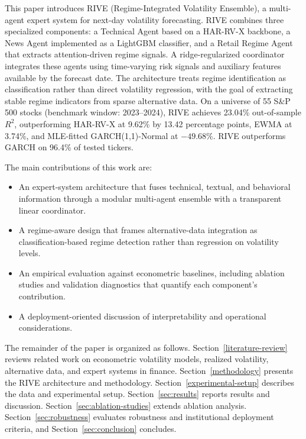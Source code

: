 \documentclass[review]{elsarticle}
\begin{document}
This paper introduces RIVE (Regime-Integrated Volatility Ensemble), a multi-agent expert system for next-day volatility forecasting. RIVE combines three specialized components: a Technical Agent based on a HAR-RV-X backbone, a News Agent implemented as a LightGBM classifier, and a Retail Regime Agent that extracts attention-driven regime signals. A ridge-regularized coordinator integrates these agents using time-varying risk signals and auxiliary features available by the forecast date. The architecture treats regime identification as classification rather than direct volatility regression, with the goal of extracting stable regime indicators from sparse alternative data. On a universe of 55 S\&P 500 stocks (benchmark window: 2023--2024), RIVE achieves 23.04\% out-of-sample $R^2$, outperforming HAR-RV-X at 9.62\% by 13.42 percentage points, EWMA at 3.74\%, and MLE-fitted GARCH(1,1)-Normal at $-49.68\%$. RIVE outperforms GARCH on 96.4\% of tested tickers.

The main contributions of this work are:
\begin{itemize}
    \item An expert-system architecture that fuses technical, textual, and behavioral information through a modular multi-agent ensemble with a transparent linear coordinator.
    \item A regime-aware design that frames alternative-data integration as classification-based regime detection rather than regression on volatility levels.
    \item An empirical evaluation against econometric baselines, including ablation studies and validation diagnostics that quantify each component's contribution.
    \item A deployment-oriented discussion of interpretability and operational considerations. %
\end{itemize}

The remainder of the paper is organized as follows. Section~\ref{literature-review} reviews related work on econometric volatility models, realized volatility, alternative data, and expert systems in finance. Section~\ref{methodology} presents the RIVE architecture and methodology. Section~\ref{experimental-setup} describes the data and experimental setup. Section~\ref{sec:results} reports results and discussion. Section~\ref{sec:ablation-studies} extends ablation analysis. Section~\ref{sec:robustness} evaluates robustness and institutional deployment criteria, and Section~\ref{sec:conclusion} concludes.
\end{document}
